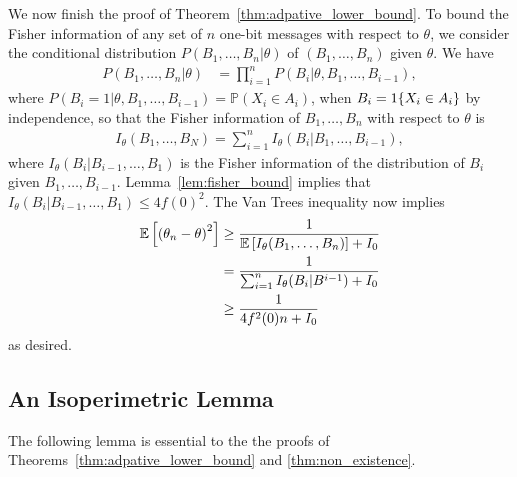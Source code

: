 We now finish the proof of Theorem~\ref{thm:adpative_lower_bound}.
To bound the Fisher information of any set of $n$ one-bit
messages with respect to $\theta$,
we consider the conditional distribution $P({B_1,\ldots,B_n|\theta})$ of
$(B_1,\ldots,B_n)$ given $\theta$. We have
\begin{align*}
  P\left( B_1,\ldots,B_n | \theta \right) & =  \prod_{i=1}^n P\left(B_i | \theta, B_1,\ldots,B_{i-1} \right),
\end{align*}
where $P\left(B_i =1 | \theta, B_1,\ldots,B_{i-1} \right) = \mathbb P\left(
X_i \in A_i\right)$, when $B_i = 1\!\left\{X_i \in A_i\right\}$ by independence,
so that the Fisher information of $B_1,\ldots,B_n$ with
respect to $\theta$ is
\begin{align}
I_\theta(B_1,\ldots,B_N) = \sum_{i=1}^n I_\theta (B_i|B_1,\ldots,B_{i-1}),
\label{eq:fisher_information}
\end{align}
where $I_\theta (B_i|B_{i-1},\ldots,B_1)$ is the Fisher information of the
distribution of $B_i$ given $B_1,\ldots,B_{i-1}$.
Lemma~\ref{lem:fisher_bound} implies that $I_\theta
(B_i|B_{i-1},\ldots,B_1) \leq 4f(0)^2$. The Van Trees inequality
\cite{van2004detection, gill1995applications} now implies
\begin{align*}
\mathbb{E}\left[  \left( \theta_n - \theta \right)^2\right] &  \geq \frac{1}{ \mathbb{E}\left[  I_\theta(B_1,\ldots,B_n)\right] + I_0} \\
& = \frac{1}{ \sum_{i=1}^n I_\theta (B_i | B^{i-1} ) + I_0} \\
& \geq \frac{1}{ 4f^2(0) n + I_0}
\end{align*}
as desired.

\subsection{An Isoperimetric Lemma}
\label{sec:bound_intervals_delta}

The following lemma is essential to the the proofs
of Theorems~\ref{thm:adpative_lower_bound} and
\ref{thm:non_existence}.

